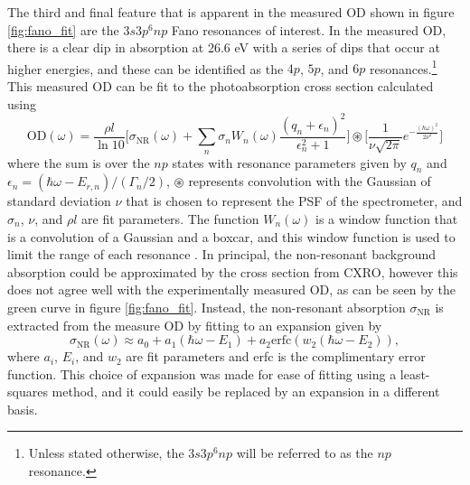 The third and final feature that is apparent in the measured OD shown in figure \ref{fig:fano_fit} are the $3s3p^6np$ Fano resonances of interest.  In the measured OD, there is a clear dip in absorption at 26.6 eV with a series of dips that occur at higher energies, and these can be identified as the $4p$, $5p$, and $6p$ resonances.\footnote{Unless stated otherwise, the $3s3p^6np$ will be referred to as the $np$ resonance.} This measured OD can be fit to the photoabsorption cross section calculated using
\begin{equation}
\label{eqn:OD_PSF_fit_func}
	\mathrm{OD}(\omega) = \frac{\rho l}{\ln 10}\bigg[\sigma_{\mathrm{NR}}(\omega) + \sum_{n}\sigma_{n}W_{n}(\omega)\frac{(q_n + \epsilon_n)^2}{\epsilon_{n}^2 + 1}\bigg] \circledast \bigg[\frac{1}{\nu \sqrt{2\pi}}e^{-\frac{(\hbar\omega)^2}{2\nu^2}}\bigg]
\end{equation}
where the sum is over the $np$ states with resonance parameters given by $q_n$ and $\epsilon_{n}=(\hbar\omega-E_{r,n})/(\Gamma_n/2)$, $\circledast$ represents convolution with the Gaussian of standard deviation $\nu$ that is chosen to represent the PSF of the spectrometer, and $\sigma_{n}$, $\nu$, and $\rho l$ are fit parameters.  The function $W_{n}(\omega)$ is a window function that is a convolution of a Gaussian and a boxcar, and this window function is used to limit the range of each resonance \cite{chuTheoryUltrafastAutoionization2010, caretteMulticonfigurationalHartreeFockClosecoupling2013}. In principal, the non-resonant background absorption could be approximated by the cross section from CXRO, however this does not agree well with the experimentally measured OD, as can be seen by the green curve in figure \ref{fig:fano_fit}.  Instead, the non-resonant absorption $\sigma_{\mathrm{NR}}$ is extracted from the measure OD by fitting to an expansion given by
\begin{equation}
\label{eqn:sigma_NR_fit}
	\sigma_{\mathrm{NR}}(\omega) \approx a_0 + a_1(\hbar\omega - E_1) + a_2\mathrm{erfc}(w_2(\hbar\omega - E_2)),
\end{equation}
where $a_i$, $E_i$, and $w_2$ are fit parameters and erfc is the complimentary error function.  This choice of expansion was made for ease of fitting using a least-squares method, and it could easily be replaced by an expansion in a different basis.  


